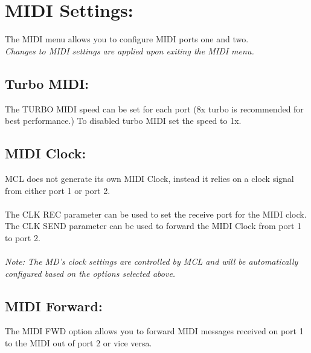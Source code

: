 \chapter{MIDI Settings:}
The MIDI menu allows you to configure MIDI ports one and two.
\\
\textit{Changes to MIDI settings are applied upon exiting the MIDI menu.}

\section{Turbo MIDI:}
The TURBO MIDI speed can be set for each port (8x turbo is recommended for best performance.) To disabled turbo MIDI set the speed to 1x.
\section{MIDI Clock:}
MCL does not generate its own MIDI Clock, instead it relies on a clock signal from either port 1 or port 2.\\\\
The CLK REC parameter can be used to set the receive port for the MIDI clock.\\
The CLK SEND parameter can be used to forward the MIDI Clock from port 1 to port 2.\\\\
\textit{Note: The MD's clock settings are controlled by MCL and will be automatically configured based on the options selected above.}

\section{MIDI Forward:}
The MIDI FWD option allows you to forward MIDI messages received on port 1 to the MIDI out of port 2 or vice versa.
